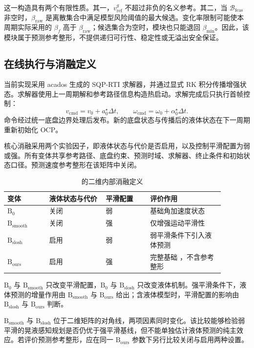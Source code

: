 这一构造具有两个有限性质。其一，$v_{\mathrm{ref}}^{g}$ 不超过非负的名义参考。其二，当 $\mathcal{B}_{\mathrm{feas}}$ 非空时，$\beta_{\mathrm{raw}}$ 是离散集合中满足模型风险阈值的最大候选。变化率限制可能使本周期实际采用的 $\beta_f$ 高于 $\beta_{\mathrm{raw}}$；候选集合为空时，模块也只能退回 $\beta_{\min}$。因此，该模块属于预测参考整形，不提供递归可行性、稳定性或无溢出安全保证。

\subsection{在线执行与消融定义}

当前实现采用 acados 生成的 SQP-RTI 求解器，并通过显式 RK 积分传播增强状态。求解器使用上一周期解和参考路径信息构造热启动。求解完成后只执行首帧控制：
\begin{equation}
  v_{\mathrm{cmd}}=v_0+a_0^{\star}\Delta t,\qquad
  \omega_{\mathrm{cmd}}=\omega_0+\alpha_0^{\star}\Delta t.
  \label{eq:cmd_generation}
\end{equation}
命令经过统一底盘边界处理后发布。新的底盘状态与传播后的液体状态在下一周期重新初始化 OCP。

核心消融采用两个实验因子，即液体状态与代价是否启用，以及控制平滑配置为弱或强。所有变体共享参考路径、底盘约束、预测时域、求解器、终止条件和初始状态口径。预测速度参考整形在该矩阵中关闭。

\begin{table}[t]
  \centering
  \footnotesize
  \setlength{\tabcolsep}{3pt}
  \renewcommand{\arraystretch}{1.08}
  \caption{\SPMPC{} 的二维内部消融定义}
  \label{tab:method_variants}
  \begin{tabular}{p{0.17\linewidth} p{0.23\linewidth} p{0.18\linewidth} p{0.30\linewidth}}
    \toprule
    变体 & 液体状态与代价 & 平滑配置 & 评价作用 \\
    \midrule
    $\mathrm{B}_{0}$ & 关闭 & 弱 & 基础角加速度状态 \MPCC{} \\
    $\mathrm{B}_{\mathrm{smooth}}$ & 关闭 & 强 & 仅增强运动平滑性 \\
    $\mathrm{B}_{\mathrm{slosh}}$ & 启用 & 弱 & 弱平滑条件下引入液体预测 \\
    $\mathrm{B}_{\mathrm{ours}}$ & 启用 & 强 & 完整基础 \SPMPC{}，不含参考整形 \\
    \bottomrule
  \end{tabular}
\end{table}

$\mathrm{B}_{0}$ 与 $\mathrm{B}_{\mathrm{smooth}}$ 只改变平滑配置，$\mathrm{B}_{0}$ 与 $\mathrm{B}_{\mathrm{slosh}}$ 只改变液体机制。强平滑条件下，液体预测的增量作用由 $\mathrm{B}_{\mathrm{smooth}}$ 与 $\mathrm{B}_{\mathrm{ours}}$ 给出；含液体模型时，平滑配置的影响由 $\mathrm{B}_{\mathrm{slosh}}$ 与 $\mathrm{B}_{\mathrm{ours}}$ 判断。

$\mathrm{B}_{\mathrm{smooth}}$ 与 $\mathrm{B}_{\mathrm{slosh}}$ 位于二维矩阵的对角线，两项因素同时变化。该比较能够检验弱平滑的晃液感知规划是否仍优于强平滑基线，但不能单独估计液体预测的纯主效应。若评价预测参考整形，应在同一 $\mathrm{B}_{\mathrm{ours}}$ 参数下另行比较关闭与启用两种设置。
